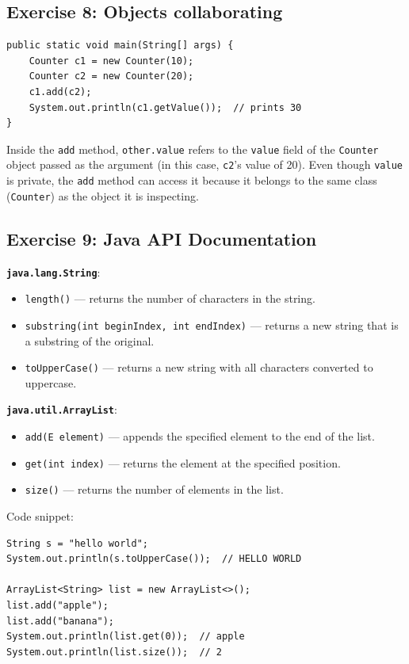 \documentclass[twoside=false,DIV=14]{scrartcl}
\begin{document}
\subsection*{Exercise 8: Objects collaborating}

\begin{lstlisting}
public static void main(String[] args) {
    Counter c1 = new Counter(10);
    Counter c2 = new Counter(20);
    c1.add(c2);
    System.out.println(c1.getValue());  // prints 30
}
\end{lstlisting}

Inside the \texttt{add} method, \texttt{other.value} refers to the \texttt{value} field of the \texttt{Counter} object passed as the argument (in this case, \texttt{c2}'s value of 20).  Even though \texttt{value} is private, the \texttt{add} method can access it because it belongs to the same class (\texttt{Counter}) as the object it is inspecting.

\subsection*{Exercise 9: Java API Documentation}

\textbf{\texttt{java.lang.String}}:

\begin{itemize}
    \item \texttt{length()} --- returns the number of characters in the string.
    \item \texttt{substring(int beginIndex, int endIndex)} --- returns a new string that is a substring of the original.
    \item \texttt{toUpperCase()} --- returns a new string with all characters converted to uppercase.
\end{itemize}

\textbf{\texttt{java.util.ArrayList}}:

\begin{itemize}
    \item \texttt{add(E element)} --- appends the specified element to the end of the list.
    \item \texttt{get(int index)} --- returns the element at the specified position.
    \item \texttt{size()} --- returns the number of elements in the list.
\end{itemize}

Code snippet:

\begin{lstlisting}
String s = "hello world";
System.out.println(s.toUpperCase());  // HELLO WORLD

ArrayList<String> list = new ArrayList<>();
list.add("apple");
list.add("banana");
System.out.println(list.get(0));  // apple
System.out.println(list.size());  // 2
\end{lstlisting}
\end{document}
